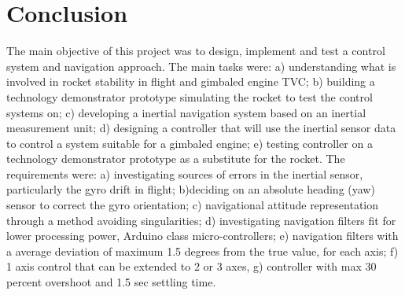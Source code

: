 \chapter{Conclusion}

The main objective of this project was to design, implement and test a control system and navigation approach. The main tasks were:
a) understanding what is involved in rocket stability in flight and gimbaled engine TVC;
b) building a technology demonstrator prototype simulating the rocket to test the control systems on;
c) developing a inertial navigation system based on an inertial measurement unit;
d) designing a controller that will use the inertial sensor data to control a system suitable for a gimbaled engine;
e) testing controller on a technology demonstrator prototype as a substitute for the rocket.
The requirements were: a) investigating sources of errors in the inertial sensor, particularly the gyro drift in flight; b)deciding on an absolute heading (yaw) sensor to correct the gyro orientation; c) navigational attitude representation through a method avoiding singularities; d) investigating navigation filters fit for lower processing power, Arduino class micro-controllers; e) navigation filters with a average deviation of maximum 1.5 degrees from the true value, for each axis; f) 1 axis control that can be extended to 2 or 3 axes, g) controller with max 30 percent overshoot and 1.5 sec settling time.



